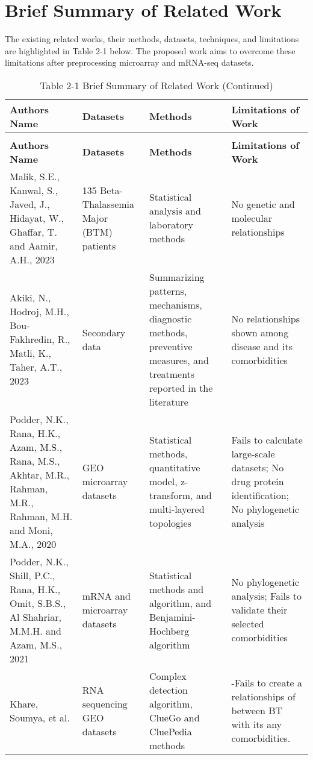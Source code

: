 \section{Brief Summary of Related Work}
\label{sec:sec2_2}

The existing related works, their methods, datasets, techniques, and limitations are highlighted in Table 2-1 below. The proposed work aims to overcome these limitations after preprocessing microarray and mRNA-seq datasets.

\vspace{5mm} %
\begin{longtable}{|p{3.8cm}|p{2.5cm}|p{3.4cm}|p{3.4cm}|}
\caption{Table 2-1 Brief Summary of Related Work} \label{tab:2.1} \\
\hline
\textbf{Authors Name} & \textbf{Datasets} & \textbf{Methods} & \textbf{Limitations of Work} \\
\hline
\endfirsthead
\caption[]{Table 2-1 Brief Summary of Related Work (Continued)} \\
\hline
\textbf{Authors Name} & \textbf{Datasets} & \textbf{Methods} & \textbf{Limitations of Work} \\
\hline
\endhead
\hline
\endfoot
Malik, S.E., Kanwal, S., Javed, J., Hidayat, W., Ghaffar, T. and Aamir, A.H., 2023 \cite{b1} & 135 Beta-Thalassemia Major (BTM) patients & Statistical analysis and laboratory methods & No genetic and molecular relationships \\
\hline
Akiki, N., Hodroj, M.H., Bou-Fakhredin, R., Matli, K., Taher, A.T., 2023 \cite{b2} & Secondary data & Summarizing patterns, mechanisms, diagnostic methods, preventive measures, and treatments reported in the literature & No relationships shown among disease and its comorbidities \\
\hline
Podder, N.K., Rana, H.K., Azam, M.S., Rana, M.S., Akhtar, M.R., Rahman, M.R., Rahman, M.H. and Moni, M.A., 2020 \cite{b3} & GEO microarray datasets & Statistical methods, quantitative model, z-transform, and multi-layered topologies & Fails to calculate large-scale datasets; No drug protein identification; No phylogenetic analysis \\
\hline
Podder, N.K., Shill, P.C., Rana, H.K., Omit, S.B.S., Al Shahriar, M.M.H. and Azam, M.S., 2021 \cite{b10} & mRNA and microarray datasets & Statistical methods and algorithm, and Benjamini-Hochberg algorithm & No phylogenetic analysis; Fails to validate their selected comorbidities \\
\hline
Khare, Soumya, et al. \cite{b12} &	RNA sequencing GEO datasets & Complex detection algorithm, ClueGo and CluePedia methods &	-Fails to create a relationships of between BT with its any comorbidities.\\

\end{longtable}
